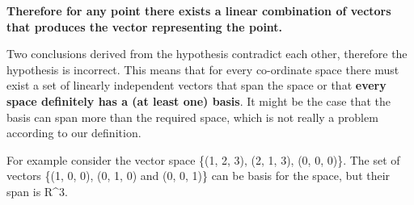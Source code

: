 \documentclass[12pt]{article}
\begin{document}
\textbf{Therefore for any point there exists a linear combination of vectors that produces the vector representing the point.}

Two conclusions derived from the hypothesis contradict each other, therefore the hypothesis is incorrect. This means that for every co-ordinate space there must exist a set of linearly independent vectors that span the space or that \textbf{every space definitely has a (at least one) basis}. It might be the case that the basis can span more than the required space, which is not really a problem according to our definition.

For example consider the vector space \{(1, 2, 3), (2, 1, 3), (0, 0, 0)\}. The set of vectors \{(1, 0, 0), (0, 1, 0) and (0, 0, 1)\} can be basis for the space, but their span is R^3.
\end{document}
